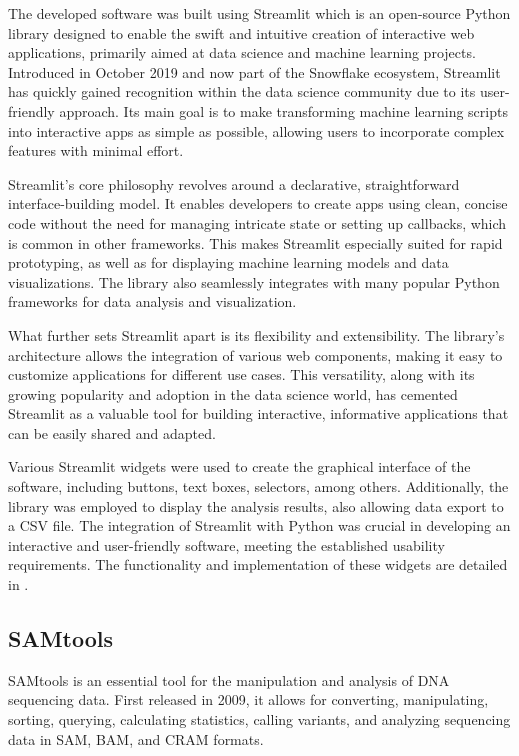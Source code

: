 The developed software was built using Streamlit which is an open-source Python library designed to enable the swift and intuitive creation of interactive web applications, primarily aimed at data science and machine learning projects. Introduced in October 2019 and now part of the Snowflake ecosystem, Streamlit has quickly gained recognition within the data science community due to its user-friendly approach. Its main goal is to make transforming machine learning scripts into interactive apps as simple as possible, allowing users to incorporate complex features with minimal effort. \cite{Sehm2022}

Streamlit's core philosophy revolves around a declarative, straightforward interface-building model. It enables developers to create apps using clean, concise code without the need for managing intricate state or setting up callbacks, which is common in other frameworks. This makes Streamlit especially suited for rapid prototyping, as well as for displaying machine learning models and data visualizations. The library also seamlessly integrates with many popular Python frameworks for data analysis and visualization. \cite{Sehm2022}

What further sets Streamlit apart is its flexibility and extensibility. The library's architecture allows the integration of various web components, making it easy to customize applications for different use cases. This versatility, along with its growing popularity and adoption in the data science world, has cemented Streamlit as a valuable tool for building interactive, informative applications that can be easily shared and adapted. \cite{Dayanithi2023}

Various Streamlit widgets were used to create the graphical interface of the software, including buttons, text boxes, selectors, among others. Additionally, the library was employed to display the analysis results, also allowing data export to a CSV file. The integration of Streamlit with Python was crucial in developing an interactive and user-friendly software, meeting the established usability requirements. The functionality and implementation of these widgets are detailed in \cite{streamlit_doc}.



\subsection{SAMtools}

SAMtools is an essential tool for the manipulation and analysis of DNA sequencing data. First released in 2009, it allows for converting, manipulating, sorting, querying, calculating statistics, calling variants, and analyzing sequencing data in SAM, BAM, and CRAM formats. \cite{samtools}

